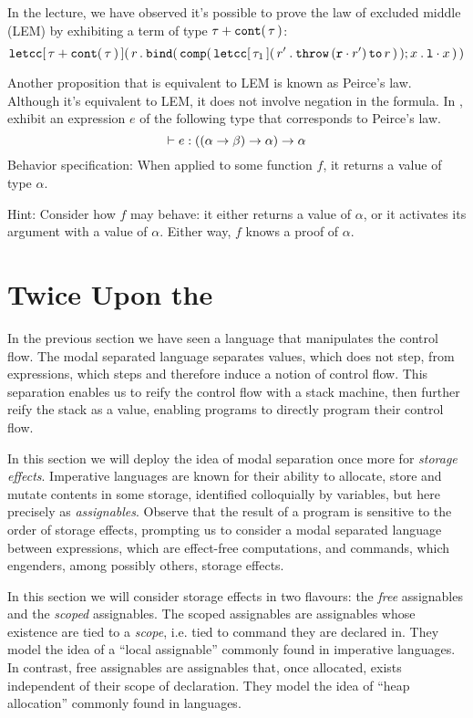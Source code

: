 \documentclass[11pt]{article}
\begin{document}

In the lecture, we have observed it's possible to prove the law of excluded middle (LEM) by exhibiting a term of type ${\tau}\mathbin{+}{{\mathtt{cont}}\mathtt{(}\,\tau\,\mathtt{)}}$:
$${\mathtt{letcc}}\mathtt{[}\,{\tau + {\mathtt{cont}}\mathtt{(}\,\tau\,\mathtt{)}}\,\mathtt{]}\mathtt{(}\,{r}\mathbin{\mathtt{.}}{{\mathtt{bind}}\mathtt{(}\,{\mathtt{comp}}\mathtt{(}\,{\mathtt{letcc}}\mathtt{[}\,{\tau_1}\,\mathtt{]}\mathtt{(}\,{r'}\mathbin{\mathtt{.}}{\mathop{\mathtt{throw}}\nolimits{ ({\ensuremath{\mathtt{r}}}\mathbin{\cdot}{r'})}\mathop{\mathtt{to}}\nolimits{r}}\,\mathtt{)}\,\mathtt{)};{x}\mathbin{\mathtt{.}}{{\mathtt{l}}\mathbin{\cdot}{x}}\,\mathtt{)}}\,\mathtt{)}$$

\begin{task}{10}
Another proposition that is equivalent to LEM is known as Peirce's law.
%
Although it's equivalent to LEM, it does not involve negation in the
formula. In , exhibit an expression $e$
of the following type that corresponds to Peirce's law.
%
$$\vdash {e}\mathrel{:}{ {({({\alpha}\mathrel{\to}{\beta})}\mathrel{\to}{\alpha})}\mathrel{\to}{\alpha} }$$
%
\textsf{Behavior specification:}
When applied to some function $f$, it returns a value of type $\alpha$.

\textsf{Hint:} Consider how $f$ may behave: it either returns a value of $\alpha$,
or it activates its argument with a value of $\alpha$.
Either way, $f$ knows a proof of $\alpha$.
\end{task}


\section{Twice Upon the \LangMA{}}

In the previous section we have seen a language that manipulates the control flow. The modal
separated language separates values, which does not step, from expressions, which steps and therefore
induce a notion of control flow. This separation enables us to reify the control flow with a stack
machine, then further reify the stack as a value, enabling programs to directly program their control
flow.

In this section we will deploy the idea of modal separation once more for \emph{storage effects}.
Imperative languages are known for their ability to allocate, store and mutate contents in some storage,
identified colloquially by variables, but here precisely as \emph{assignables}. Observe that the
result of a program is sensitive to the order of storage effects, prompting us to consider a modal
separated language between expressions, which are effect-free computations, and commands, which
engenders, among possibly others, storage effects.

In this section we will consider storage effects in two flavours: the \emph{free} assignables and
the \emph{scoped} assignables. The scoped assignables are assignables whose existence are tied to
a \emph{scope}, i.e. tied to command they are declared in. They model the idea of a ``local assignable''
commonly found in imperative languages. In contrast, free assignables are assignables that, once allocated,
exists independent of their scope of declaration. They model the idea of ``heap allocation'' commonly
found in languages.
\end{document}
